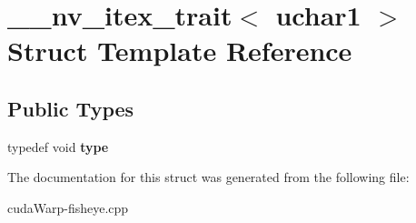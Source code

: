 \hypertarget{struct____nv__itex__trait_3_01uchar1_01_4}{}\section{\+\_\+\+\_\+nv\+\_\+itex\+\_\+trait$<$ uchar1 $>$ Struct Template Reference}
\label{struct____nv__itex__trait_3_01uchar1_01_4}
\subsection*{Public Types}
\begin{DoxyCompactItemize}
\item 
typedef void {\bfseries type}\hypertarget{struct____nv__itex__trait_3_01uchar1_01_4_a3f81d2b83e85effc2b940c6094619ac5}{}\label{struct____nv__itex__trait_3_01uchar1_01_4_a3f81d2b83e85effc2b940c6094619ac5}

\end{DoxyCompactItemize}


The documentation for this struct was generated from the following file\+:\begin{DoxyCompactItemize}
\item 
cuda\+Warp-\/fisheye.\+cpp\end{DoxyCompactItemize}
